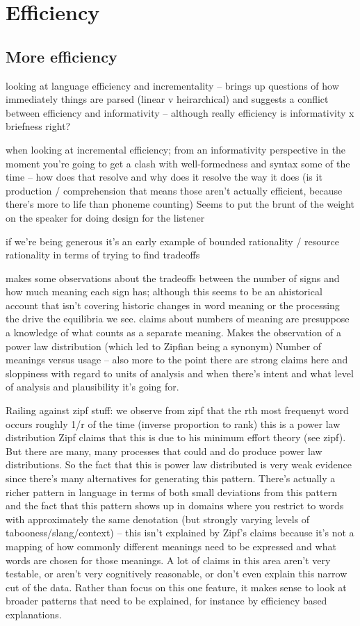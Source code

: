 \documentclass[]{article}
\begin{document}
\section{Efficiency}
\subsection{More efficiency}
\cite{rubio-fernandez2021} looking at language efficiency and incrementality -- brings up questions of how immediately things are parsed (linear v heirarchical) and suggests a conflict between efficiency and informativity -- although really efficiency is informativity x briefness right? 

\cite{rubio-fernandez2021} when looking at incremental efficiency; from an informativity perspective in the moment you're going to get a clash with well-formedness and syntax some of the time -- how does that resolve and why does it resolve the way it does (is it production / comprehension that means those aren't actually efficient, because there's more to life than phoneme counting) Seems to put the brunt of the weight on the speaker for doing design for the listener 

\cite{zipf1949} if we're being generous it's an early example of bounded rationality / resource rationality in terms of trying to find tradeoffs 

\cite{zipf1949} makes some observations about the tradeoffs between the number of signs and how much meaning each sign has; although this seems to be an ahistorical account that isn't covering historic changes in word meaning or the processing the drive the equilibria we see. claims about numbers of meaning are presuppose a knowledge of what counts as a separate meaning. Makes the observation of a power law distribution (which led to Zipfian being a synonym) Number of meanings versus usage -- also more to the point there are strong claims here and sloppiness with regard to units of analysis and when there's intent and what level of analysis and plausibility it's going for. 
 
Railing against zipf stuff: \cite{piantadosi2014} we observe from zipf that the rth most frequenyt word occurs roughly 1/r of the time (inverse proportion to rank) this is a power law distribution 
Zipf claims that this is due to his minimum effort theory (see zipf). But there are many, many processes that could and do produce power law distributions. So the fact that this is power law distributed is very weak evidence since there's many alternatives for generating this pattern. There's actually a richer pattern in language in terms of both small deviations from this pattern and the fact that this pattern shows up in domains where you restrict to words with approximately the same denotation (but strongly varying levels of tabooness/slang/context) -- this isn't explained by Zipf's claims because it's not a mapping of how commonly different meanings need to be expressed and what words are chosen for those meanings. A lot of claims in this area aren't very testable, or aren't very cognitively reasonable, or don't even explain this narrow cut of the data. Rather than focus on this one feature, it makes sense to look at broader patterns that need to be explained, for instance by efficiency based explanations. 
\end{document}
